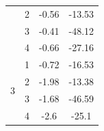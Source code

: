 \begin{table}[H]
\begin{tabular}{|c|c|c|c|}
                                                                               & 2                                                                            & -0.56                                                                            & -13.53                                                                           \\ \cline{2-4} 
                                                                               & 3                                                                            & -0.41                                                                            & -48.12                                                                           \\ \cline{2-4} 
                                                                               & 4                                                                            & -0.66                                                                            & -27.16                                                                           \\ \hline
  \multirow{4}{*}{3}                                                           & 1                                                                            & -0.72                                                                            & -16.53                                                                           \\ \cline{2-4} 
                                                                               & 2                                                                            & -1.98                                                                            & -13.38                                                                           \\ \cline{2-4} 
                                                                               & 3                                                                            & -1.68                                                                            & -46.59                                                                           \\ \cline{2-4} 
                                                                               & 4                                                                            & -2.6                                                                             & -25.1                                                                            \\ \hline

\end{tabular}
\end{table}
